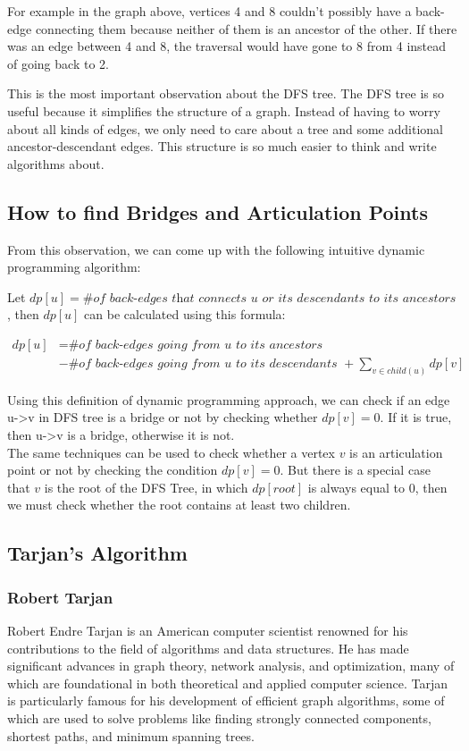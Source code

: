\documentclass{article}
\begin{document}
For example in the graph above, vertices 4 and 8 couldn't possibly have a back-edge connecting them because neither of them is an ancestor of the other. If there was an edge between 4 and 8, the traversal would have gone to 8 from 4 instead of going back to 2.

This is the most important observation about the DFS tree. The DFS tree is so useful because it simplifies the structure of a graph. Instead of having to worry about all kinds of edges, we only need to care about a tree and some additional ancestor-descendant edges. This structure is so much easier to think and write algorithms about.

\subsection{How to find Bridges and Articulation Points}

From this observation, we can come up with the following intuitive dynamic programming algorithm:

Let $dp[u] = \# \textit{of back-edges that connects $u$ or its descendants to its ancestors}$, then $dp[u]$ can be calculated using this formula:

\begin{align*}
    dp[u] &= \textit{\# of back-edges going from u to its ancestors }\\
            &- \textit{\# of back-edges going from u to its descendants } + \sum_{v \in child(u)} dp[v] 
\end{align*}

Using this definition of dynamic programming approach, we can check if an edge u->v in DFS tree is a bridge or not by checking whether $dp[v] = 0$. If it is true, then u->v is a bridge, otherwise it is not.\\

The same techniques can be used to check whether a vertex $v$  is an articulation point or not by checking the condition $dp[v] = 0$. But there is a special case that $v$ is the root of the DFS Tree, in which $dp[root]$ is always equal to 0, then we must check whether the root contains at least two children.

\subsection{Tarjan's Algorithm}

\subsubsection{Robert Tarjan}
Robert Endre Tarjan is an American computer scientist renowned for his contributions to the field of algorithms and data structures. He has made significant advances in graph theory, network analysis, and optimization, many of which are foundational in both theoretical and applied computer science. Tarjan is particularly famous for his development of efficient graph algorithms, some of which are used to solve problems like finding strongly connected components, shortest paths, and minimum spanning trees.
\end{document}
